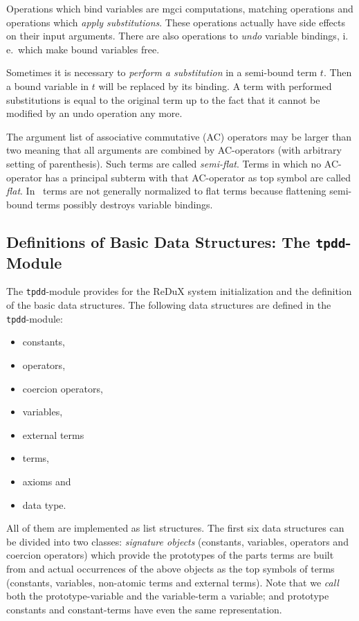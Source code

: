 Operations which bind variables are mgci computations, matching operations 
and operations which {\em apply substitutions}.
These operations actually have side effects on their input arguments.
There are also operations to {\em undo} variable bindings,
i.\,e.\ which make bound variables free.

Sometimes it is necessary to {\em perform a substitution} in a semi-bound
term $t$.
Then a bound variable in $t$ will be replaced by its binding.
A term with performed substitutions is equal to the original term up to the fact that it cannot be modified by an undo operation any more.

The argument list of associative commutative (AC) operators may be larger than 
two meaning that all arguments are combined by AC-operators (with 
arbitrary setting of parenthesis).
Such terms are called {\em semi-flat}.
Terms in which no AC-operator has a principal subterm with that
AC-operator as top symbol are called {\em flat}.
In \redux\ terms are not generally normalized to flat terms because
flattening semi-bound terms possibly destroys variable bindings.

\subsection{Definitions of Basic Data Structures: The {\tt tpdd}-Module} 
\label{ss:tpdd}

The {\tt tpdd}-module provides for the ReDuX system initialization and the
definition of the basic data structures.
The following data structures are defined in the {\tt tpdd}-module: 
\begin{itemize}
 \item constants,
 \item operators,
 \item coercion operators,
 \item variables,
 \item external terms
 \item terms,
 \item axioms and
 \item data type.
\end{itemize}
All of them are implemented as list structures.
The first six data structures can be divided into two classes:
{\em signature objects} (constants, variables, operators  and
coercion operators) which provide the prototypes of the parts terms are built
from and actual occurrences of the above objects as the  top symbols of terms
(constants, variables, non-atomic terms and external terms).
Note that we {\em call} both the prototype-variable and the variable-term a
variable; and
prototype constants and constant-terms have even the same representation.

